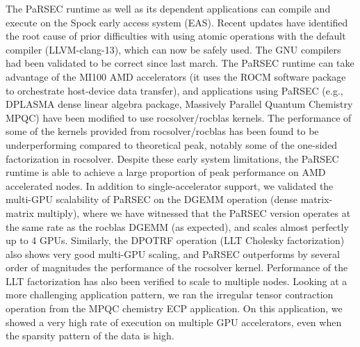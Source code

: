 The PaRSEC runtime as well as its dependent applications can compile and 
execute on the Spock early access system (EAS). Recent updates have identified
the root cause of prior difficulties with using atomic operations with the 
default compiler (LLVM-clang-13), which can now be safely used. The GNU compilers had been validated to be correct since last march.
%
The PaRSEC runtime can take advantage of the MI100 AMD accelerators (it uses the ROCM
software package to orchestrate host-device data transfer), and applications
using PaRSEC (e.g., DPLASMA dense linear algebra package, Massively Parallel Quantum Chemistry MPQC) have been modified to use rocsolver/rocblas
kernels. The performance of some of the kernels provided from rocsolver/rocblas 
has been found to be underperforming compared to theoretical peak, notably some
of the one-sided factorization in rocsolver. Despite these early system limitations, the PaRSEC
runtime is able to achieve a large proportion of peak performance on AMD
accelerated nodes. In addition to single-accelerator support, we validated the
multi-GPU scalability of PaRSEC on the DGEMM operation (dense matrix-matrix multiply),
where we have witnessed that the PaRSEC
version operates at the same rate as the rocblas DGEMM (as expected), and 
scales almost perfectly up to 4 GPUs. Similarly, the DPOTRF operation (LLT Cholesky factorization)
also shows very good multi-GPU scaling, and PaRSEC outperforms by
several order of magnitudes the performance of the rocsolver kernel. Performance of
the LLT factorization has also been verified to scale to multiple nodes. Looking at a
more challenging application pattern, we ran the irregular tensor contraction operation
from the MPQC chemistry ECP application. On this application, we showed a
very high rate of execution on multiple GPU accelerators, even when the sparsity
pattern of the data is high.

